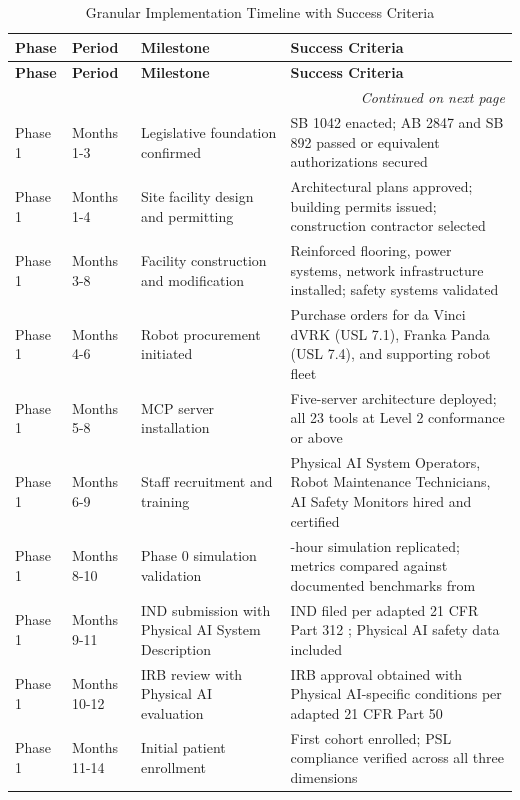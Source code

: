 \begin{longtable}{l l >{\raggedright\arraybackslash}p{4.0cm} >{\raggedright\arraybackslash}p{5.5cm}}
\caption{Granular Implementation Timeline with Success Criteria}
\label{tab:impl-detailed-timeline} \\
\toprule
\textbf{Phase} & \textbf{Period} & \textbf{Milestone} & \textbf{Success Criteria} \\
\midrule
\endfirsthead
\toprule
\textbf{Phase} & \textbf{Period} & \textbf{Milestone} & \textbf{Success Criteria} \\
\midrule
\endhead
\midrule
\multicolumn{4}{r}{\textit{Continued on next page}} \\
\bottomrule
\endfoot
\bottomrule
\endlastfoot
Phase 1 & Months 1-3 & Legislative foundation confirmed & SB 1042 enacted; AB 2847 and SB 892 passed or equivalent authorizations secured \\
Phase 1 & Months 1-4 & Site facility design and permitting & Architectural plans approved; building permits issued; construction contractor selected \\
Phase 1 & Months 3-8 & Facility construction and modification & Reinforced flooring, power systems, network infrastructure installed; safety systems validated \\
Phase 1 & Months 4-6 & Robot procurement initiated & Purchase orders for da Vinci dVRK (USL 7.1), Franka Panda (USL 7.4), and supporting robot fleet \\
Phase 1 & Months 5-8 & MCP server installation & Five-server architecture deployed; all 23 tools at Level 2 conformance or above \\
Phase 1 & Months 6-9 & Staff recruitment and training & Physical AI System Operators, Robot Maintenance Technicians, AI Safety Monitors hired and certified \\
Phase 1 & Months 8-10 & Phase 0 simulation validation & 24-hour simulation replicated; metrics compared against documented benchmarks from \cite{site-docs} \\
Phase 1 & Months 9-11 & IND submission with Physical AI System Description & IND filed per adapted 21 CFR Part 312 \cite{cfr312-adapt}; Physical AI safety data included \\
Phase 1 & Months 10-12 & IRB review with Physical AI evaluation & IRB approval obtained with Physical AI-specific conditions per adapted 21 CFR Part 50 \cite{cfr50-adapt} \\
Phase 1 & Months 11-14 & Initial patient enrollment & First cohort enrolled; PSL compliance verified across all three dimensions \\

\end{longtable}
